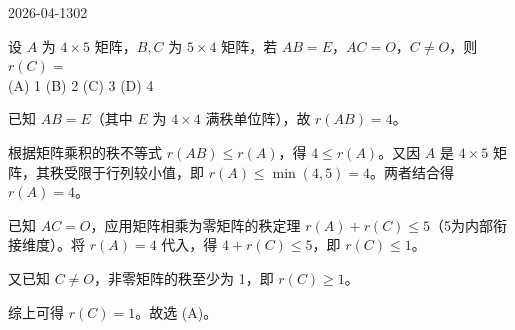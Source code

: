 \begin{mistake}{2026-04-13}{02}

\begin{problemcontent}
设 \(A\) 为 \(4 \times 5\) 矩阵，\(B,C\) 为 \(5 \times 4\) 矩阵，若 \(AB = E\)，\(AC = O\)，\(C \neq O\)，则 \(r(C) =\) \\
(A) 1 \qquad (B) 2 \qquad (C) 3 \qquad (D) 4
\end{problemcontent}

\begin{solutioncontent}
已知 \(AB=E\)（其中 \(E\) 为 \(4 \times 4\) 满秩单位阵），故 \(r(AB)=4\)。

根据矩阵乘积的秩不等式 \(r(AB) \le r(A)\)，得 \(4 \le r(A)\)。又因 \(A\) 是 \(4 \times 5\) 矩阵，其秩受限于行列较小值，即 \(r(A) \le \min(4,5)=4\)。两者结合得 \(r(A)=4\)。

已知 \(AC=O\)，应用矩阵相乘为零矩阵的秩定理 \(r(A) + r(C) \le 5\)（5为内部衔接维度）。将 \(r(A)=4\) 代入，得 \(4 + r(C) \le 5\)，即 \(r(C) \le 1\)。

又已知 \(C \neq O\)，非零矩阵的秩至少为 1，即 \(r(C) \ge 1\)。

综上可得 \(r(C) = 1\)。故选 (A)。
\end{solutioncontent}


\end{mistake}
